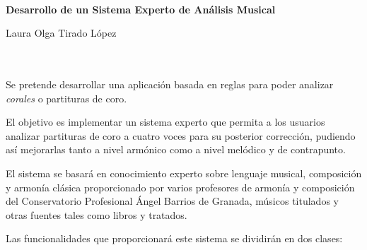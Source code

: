 \documentclass[a4paper, 12pt]{report}
\makeatletter
\numberwithin{equation}{section} %
\numberwithin{figure}{section} %
\numberwithin{table}{section} %
\newcommand\frontmatter{%
    \cleardoublepage
  \pagenumbering{roman}}
\makeatother
\begin{document}

\newpage
\thispagestyle{empty}
\
\newpage
\thispagestyle{empty}
\
\newpage
\thispagestyle{empty}
\

\frontmatter

\thispagestyle{empty}

\begin{center}
{\large\bfseries Desarrollo de un Sistema Experto de Análisis Musical}\\
\end{center}
\begin{center}
Laura Olga Tirado López\\
\end{center}

\\

\vspace{0.7cm}
\noindent{\textbf{Resumen}}\\

Se pretende desarrollar una aplicación basada en reglas para poder analizar \textit{corales} o partituras de coro.

\bigskip

El objetivo es implementar un sistema experto que permita a los usuarios analizar partituras de coro a cuatro voces para su posterior corrección, pudiendo así mejorarlas tanto a nivel armónico como a nivel melódico y de contrapunto.

\bigskip

El sistema se basará en conocimiento experto sobre lenguaje musical, composición y armonía clásica proporcionado por varios profesores de armonía y composición del Conservatorio Profesional Ángel Barrios de Granada, músicos titulados y otras fuentes tales como libros y tratados. 

\bigskip

Las funcionalidades que proporcionará este sistema se dividirán en dos clases:
\end{document}
